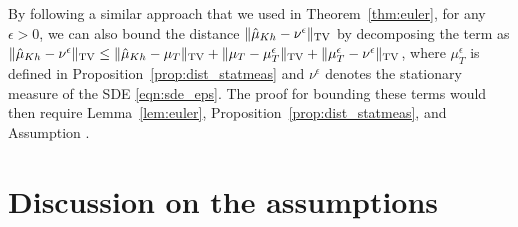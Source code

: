 \begin{remark}
By following a similar approach that we used in Theorem~\ref{thm:euler}, for any $\epsilon > 0$, we can also bound the distance $\|\hat{\mu}_{Kh} - \nu^\epsilon\|_{\textnormal{TV}}$ by decomposing the term as $\|\hat{\mu}_{Kh} - \nu^\epsilon\|_{\textnormal{TV}} \leq \|\hat{\mu}_{Kh} - \mu_T\|_{\textnormal{TV}} + \| \mu_T - \mu_T^\epsilon\|_{\textnormal{TV}} + \|\mu_T^\epsilon - \nu^\epsilon \|_{\textnormal{TV}}$, where $\mu_T^\epsilon$ is defined in Proposition~\ref{prop:dist_statmeas} and $\nu^\epsilon$ denotes the stationary measure of the SDE \eqref{eqn:sde_eps}. The proof for bounding these terms would then require Lemma~\ref{lem:euler}, Proposition~\ref{prop:dist_statmeas}, and Assumption . %
\end{remark} 



\section{Discussion on the assumptions}




